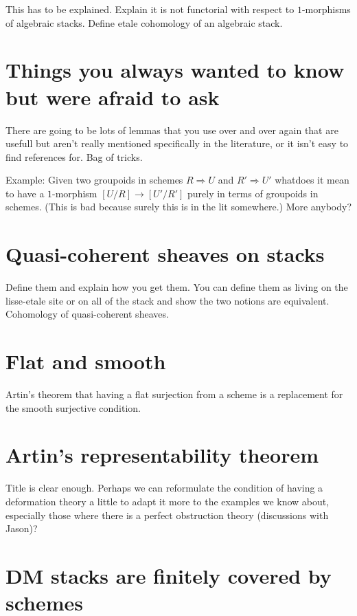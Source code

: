 \noindent
This has to be explained. Explain it is not functorial with respect to
$1$-morphisms of algebraic stacks. Define etale cohomology of an algebraic
stack.

\section{Things you always wanted to know but were afraid to ask}
\label{section-stacks-fun-lemmas}

\noindent
There are going to be lots of lemmas that you use over and over again
that are usefull but aren't really mentioned specifically in the literature,
or it isn't easy to find references for. Bag of tricks.

\medskip\noindent
Example: Given two groupoids in schemes $R\Rightarrow U$ and
$R' \Rightarrow U'$ whatdoes it mean to have a $1$-morphism
$[U/R] \to [U'/R']$ purely in terms of groupoids in schemes.
(This is bad because surely this is in the lit somewhere.)
More anybody?

\section{Quasi-coherent sheaves on stacks}
\label{section-quasi-coherent}

\noindent
Define them and explain how you get them. You can define them as living on the
lisse-etale site or on all of the stack and show the two notions are
equivalent. Cohomology of quasi-coherent sheaves.


\section{Flat and smooth}
\label{section-flat-smooth}

\noindent
Artin's theorem that having a flat surjection from a scheme is a replacement
for the smooth surjective condition.

\section{Artin's representability theorem}
\label{section-representability}

\noindent
Title is clear enough. Perhaps we can reformulate the condition of having a
deformation theory a little to adapt it more to the examples we know about,
especially those where there is a perfect obstruction theory (discussions
with Jason)?

\section{DM stacks are finitely covered by schemes}
\label{section-dm-finite-cover}

